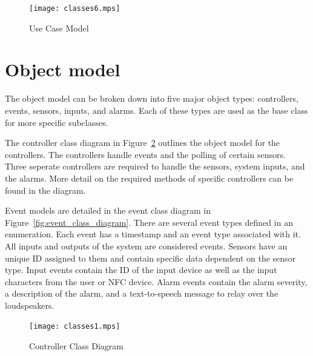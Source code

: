 \documentclass{report}
\begin{document}
\setlength{\parindent}{\originalParindent}
\setlength{\parskip}{\originalParskip}

\begin{figure}[hp]
    \centering
        \caption{Use Case Model}
        \scriptsize
        \setlength{\unitlength}{2.0em}
        \texttt{[image: classes6.mps]}
        \normalsize
    \label{fig:use_case_model}
\end{figure}

\section{Object model}
The object model can be broken down into five major object types: controllers,
events, sensors, inputs, and alarms. Each of these types are used as the base
class for more specific subclasses.

The controller class diagram in Figure~\ref{fig:controller_class_diagram}
outlines the object model for the controllers. The controllers handle events
and the polling of certain sensors. Three seperate controllers are required to
handle the sensors, system inputs, and the alarms. More detail on the required
methods of specific controllers can be found in the diagram.

Event models are detailed in the event class diagram in
Figure~\ref{fig:event_class_diagram}. There are several event types defined in
an enumeration. Each event has a timestamp and an event type associated with
it. All inputs and outputs of the system are considered events. Sensors have an
unique ID assigned to them and contain specific data dependent on the sensor
type. Input events contain the ID of the input device as well as the input
characters from the user or NFC device. Alarm events contain the alarm
severity, a description of the alarm, and a text-to-speech message to relay
over the loudspeakers.

\begin{landscape}
\begin{figure}[hp]
    \centering
        \caption{Controller Class Diagram}
        \scriptsize
        \setlength{\unitlength}{2.0em}
        \texttt{[image: classes1.mps]}
        \normalsize
    \label{fig:controller_class_diagram}
\end{figure}
\end{landscape}
\end{document}

